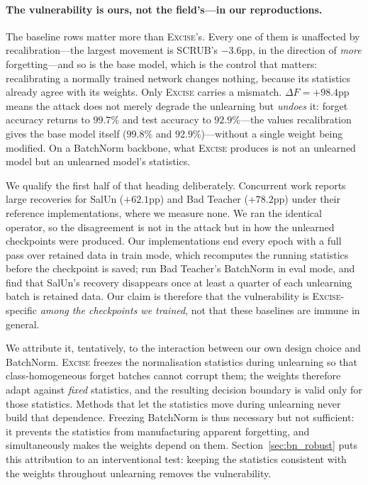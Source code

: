 \documentclass{article}
\newcommand{\ours}{\textsc{Excise}}
\newcommand{\added}[1]{{\color{revised}#1}}
\newcommand{\rev}[1]{{\color{revisedB}#1}}
\theoremstyle{remark}
\theoremstyle{plain}
\begin{document}
\paragraph{The vulnerability is ours, not the field's---in our reproductions.}
The baseline rows matter more than \ours{}'s. Every one of them is unaffected by
recalibration---the largest movement is SCRUB's $-3.6$pp, in the direction of
\emph{more} forgetting---and so is the base model, which is the control that
matters: recalibrating a normally trained network changes nothing, because its
statistics already agree with its weights. Only \ours{} carries a mismatch.
$\Delta F = +98.4$pp means the attack does not merely degrade the unlearning but
\emph{undoes} it: forget accuracy returns to $99.7\%$ and test accuracy to
$92.9\%$\rev{---the values recalibration gives the base model itself ($99.8\%$
and $92.9\%$)}---without a single weight being modified. On a BatchNorm backbone, what \ours{} produces is not an
unlearned model but an unlearned model's statistics.

We qualify the first half of that heading deliberately. \rev{Concurrent work
\citep{kalani2026batchnorm} reports large recoveries for SalUn ($+62.1$pp) and
Bad Teacher ($+78.2$pp) under their reference implementations, where we measure
none. We ran the identical operator, so the disagreement is not in the attack
but in how the unlearned checkpoints were produced. Our implementations end
every epoch with a full pass over retained data in train mode, which recomputes
the running statistics before the checkpoint is saved; \citet{kalani2026batchnorm}
run Bad Teacher's BatchNorm in eval mode, and find that SalUn's recovery
disappears once at least a quarter of each unlearning batch is retained data.}
Our claim is therefore that the vulnerability is \ours{}-specific \emph{among
the checkpoints we trained}, not that these baselines are immune in general.

We attribute it, tentatively, to the interaction between our own design choice
and BatchNorm. \ours{} freezes the normalisation statistics during unlearning so
that class-homogeneous forget batches cannot corrupt them; the weights therefore
adapt against \emph{fixed} statistics, and the resulting decision boundary is
valid only for those statistics. Methods that let the statistics move during
unlearning never build that dependence. Freezing BatchNorm is thus necessary but
not sufficient: it prevents the statistics from manufacturing apparent
forgetting, and simultaneously makes the weights depend on them.
\added{Section~\ref{sec:bn_robust} puts this attribution to an interventional
test: keeping the statistics consistent with the weights throughout unlearning
removes the vulnerability.}
\end{document}
